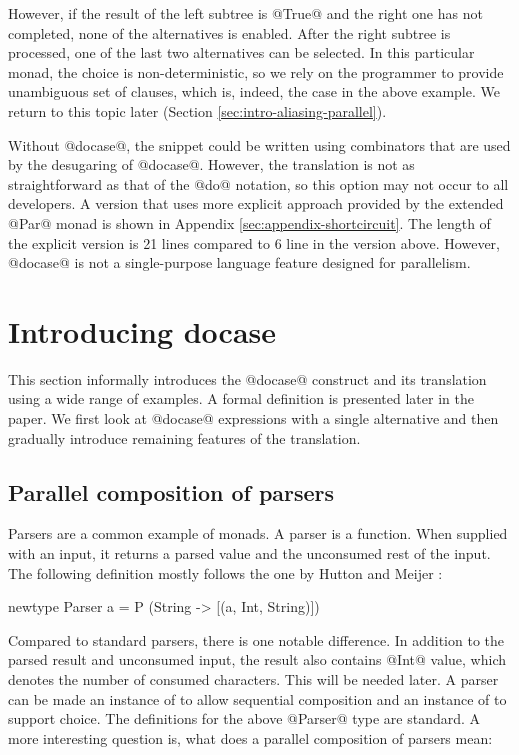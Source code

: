\documentclass[preprint]{sigplanconf}
\begin{document}
However, if the result of the left subtree is @True@ and the right one has not completed, none of 
the alternatives is enabled. After the right subtree is processed, one of the last two alternatives 
can be selected. In this particular monad, the choice is non-deterministic, so we rely on the 
programmer to provide unambiguous set of clauses, which is, indeed, the case in the 
above example. We return to this topic later (Section \ref{sec:intro-aliasing-parallel}).

Without @docase@, the snippet could be written using combinators that are used by the desugaring 
of @docase@. However, the translation is not as straightforward as that of the @do@ notation, so 
this option may not occur to all developers. A version that uses more explicit approach provided 
by the extended @Par@ monad is shown in Appendix \ref{sec:appendix-shortcircuit}. The length of 
the explicit version is 21 lines compared to 6 line in the version above. However, @docase@
is not a single-purpose language feature designed for parallelism.


\section{Introducing docase}
This section informally introduces the @docase@ construct and its translation using a wide range 
of examples. A formal definition is presented later in the paper. We first look at @docase@ 
expressions with a single alternative and then gradually introduce remaining features of the 
translation.


\subsection{Parallel composition of parsers}
\label{sec:intro-combining-parsers}
Parsers are a common example of monads. A parser is a function. When supplied with an input, it 
returns a parsed value and the unconsumed rest of the input. The following definition mostly follows
the one by Hutton and Meijer \cite{parsingtutorial}:

\begin{code}
newtype Parser a = P (String -> [(a, Int, String)])
\end{code}
Compared to standard parsers, there is one notable difference. In addition to the parsed result
and unconsumed input, the result also contains @Int@ value, which denotes the number of consumed
characters. This will be needed later.
A parser can be made an instance of  to allow sequential composition and an instance 
of  to support choice. The definitions for the above @Parser@ type are standard. 
A more interesting question is, what does a parallel composition of parsers mean:
\end{document}
